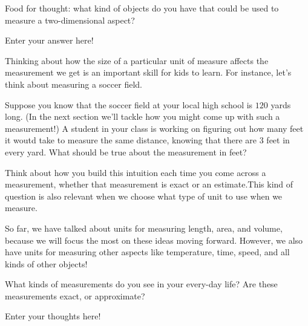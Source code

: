 \documentclass{ximera}
\begin{document}
\begin{question}
Food for thought: what kind of objects do you have that could be used to measure a two-dimensional aspect?
\begin{freeResponse}
Enter your answer here!
\end{freeResponse}
\end{question}

Thinking about how the size of a particular unit of measure affects the measurement we get is an important skill for kids to learn. For instance, let's think about measuring a soccer field.
\begin{question}
Suppose you know that the soccer field at your local high school is $120$ yards long. (In the next section we'll tackle how you might come up with such a measurement!) A student in your class is working on figuring out how many feet it woutd take to measure the same distance, knowing that there are $3$ feet in every yard. What should be true about the measurement in feet?
\begin{multipleChoice}
\end{multipleChoice}
\end{question}
Think about how you build this intuition each time you come across a measurement, whether that measurement is exact or an estimate.This kind of question is also relevant when we choose what type of unit to use when we measure.

So far, we have talked about units for measuring length, area, and volume, because we will focus the most on these ideas moving forward. However, we also have units for measuring other aspects like temperature, time, speed, and all kinds of other objects! 
\begin{question}
What kinds of measurements do you see in your every-day life? Are these measurements exact, or approximate?
\begin{freeResponse}
Enter your thoughts here!
\end{freeResponse}
\end{question}
\end{document}
